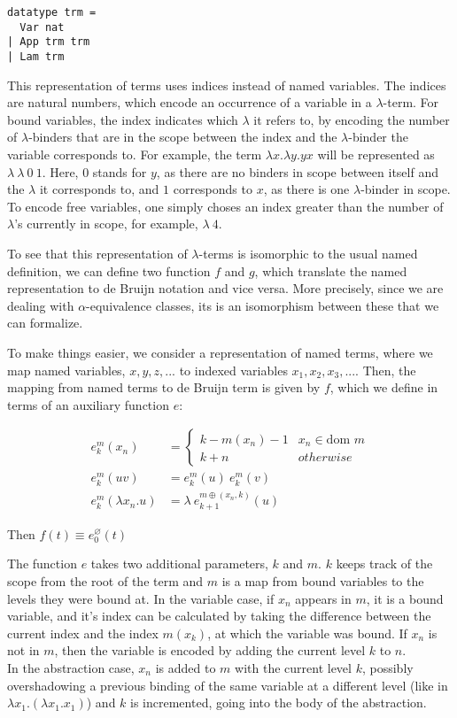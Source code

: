 \documentclass[a4paper, 12pt, twoside]{style/ociamthesis}
\theoremstyle{plain}
\theoremstyle{definition}
\theoremstyle{remark}
\let\emptyset\varnothing
\begin{document}
\begin{verbatim}
datatype trm =
  Var nat
| App trm trm
| Lam trm
\end{verbatim}

This representation of terms uses indices instead of named variables.
The indices are natural numbers, which encode an occurrence of a
variable in a \(\lambda\)-term. For bound variables, the index indicates
which \(\lambda\) it refers to, by encoding the number of
\(\lambda\)-binders that are in the scope between the index and the
\(\lambda\)-binder the variable corresponds to. For example, the term
\(\lambda x.\lambda y. yx\) will be represented as
\(\lambda\ \lambda\ 0\ 1\). Here, 0 stands for \(y\), as there are no
binders in scope between itself and the \(\lambda\) it corresponds to,
and \(1\) corresponds to \(x\), as there is one \(\lambda\)-binder in
scope. To encode free variables, one simply choses an index greater than
the number of \(\lambda\)'s currently in scope, for example,
\(\lambda\ 4\).

To see that this representation of \(\lambda\)-terms is isomorphic to
the usual named definition, we can define two function \(f\) and \(g\),
which translate the named representation to de Bruijn notation and vice
versa. More precisely, since we are dealing with \(\alpha\)-equivalence
classes, its is an isomorphism between these that we can formalize.

To make things easier, we consider a representation of named terms,
where we map named variables, \(x, y, z,...\) to indexed variables
\(x_1,x_2,x_3,...\). Then, the mapping from named terms to de Bruijn
term is given by \(f\), which we define in terms of an auxiliary
function \(e\):

\begin{align*} 
e_k^m(x_n) &= \begin{cases}
k-m(x_n)-1 & x_n \in \text{dom }m\\
k+n & otherwise
\end{cases}\\
e_k^m(uv) &= e_k^m(u)\ e_k^m(v)\\
e_k^m(\lambda x_n.u) &= \lambda\ e_{k+1}^{m \oplus (x_n,k)}(u)
\end{align*}

Then \(f(t) \equiv e_0^\emptyset(t)\)

The function \(e\) takes two additional parameters, \(k\) and \(m\).
\(k\) keeps track of the scope from the root of the term and \(m\) is a
map from bound variables to the levels they were bound at. In the
variable case, if \(x_n\) appears in \(m\), it is a bound variable, and
it's index can be calculated by taking the difference between the
current index and the index \(m(x_k)\), at which the variable was bound.
If \(x_n\) is not in \(m\), then the variable is encoded by adding the
current level \(k\) to \(n\).\\
In the abstraction case, \(x_n\) is added to \(m\) with the current
level \(k\), possibly overshadowing a previous binding of the same
variable at a different level (like in
\(\lambda x_1. (\lambda x_1. x_1)\)) and \(k\) is incremented, going
into the body of the abstraction.
\end{document}
